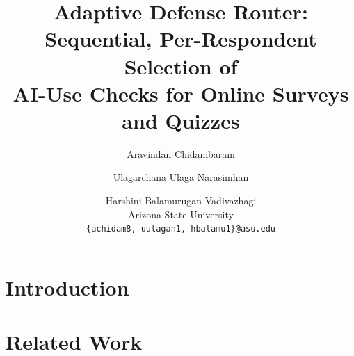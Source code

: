\documentclass[11pt]{article}
\title{Adaptive Defense Router: Sequential, Per-Respondent Selection of\\
AI-Use Checks for Online Surveys and Quizzes}
\author{Aravindan Chidambaram \and Ulagarchana Ulaga Narasimhan \and Harshini Balamurugan Vadivazhagi \\
  Arizona State University \\
  \texttt{\{achidam8, uulagan1, hbalamu1\}@asu.edu}}
\begin{document}
\maketitle

\begin{abstract}
\end{abstract}

\section{Introduction}
\label{sec:intro}

\section{Related Work}
\label{sec:related}
\end{document}
